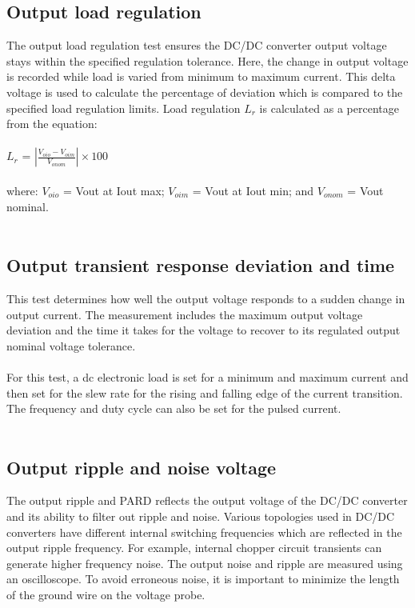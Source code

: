 \subsection{Output load regulation} 
The output load regulation test ensures the DC/DC converter output voltage stays within the specified regulation tolerance. Here, the change in output voltage is recorded while load is varied from minimum to maximum current. This delta voltage is used to calculate the percentage of deviation which is compared to the specified load regulation limits. Load regulation $L_{r}$ is calculated as a percentage from the equation:
\\ \\
\hspace*{5cm}$L_{r}$ = $\left | \frac{V_{oio}-V_{oim}}{V_{onom}} \right | \times 100$
\\ \\
where:
$V_{oio}$ = Vout at Iout max; 
$V_{oim}$ = Vout at Iout min; and
$V_{onom}$ = Vout nominal.
\\ \\
\subsection{Output transient response deviation and time}

 This test determines how well the output voltage responds to a sudden change in output current. The measurement includes the maximum output voltage deviation and the time it takes for the voltage to recover to its regulated output nominal voltage tolerance.
\\ \\
For this test, a dc electronic load is set for a minimum and maximum current and then set for the slew rate for the rising and falling edge of the current transition. The frequency and duty cycle can also be set for the pulsed current.
\\ \\
\subsection{Output ripple and noise voltage} 

The output ripple and PARD reflects the output voltage of the DC/DC converter and its ability to filter out ripple and noise. Various topologies used in DC/DC converters have different internal switching frequencies which are reflected in the output ripple frequency. For example, internal chopper circuit transients can generate higher frequency noise. The output noise and ripple are measured using an oscilloscope. To avoid erroneous noise, it is important to minimize the length of the ground wire on the voltage probe.
\\ \\
